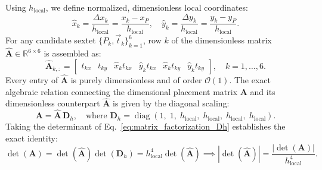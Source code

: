 \documentclass[preprint,12pt]{elsarticle}
\begin{document}
Using $h_{\mathrm{local}}$, we define normalized, dimensionless local coordinates:
\begin{equation}
\hat{x}_k = \frac{\Delta x_k}{h_{\mathrm{local}}} = \frac{x_k - x_P}{h_{\mathrm{local}}}, \quad \hat{y}_k = \frac{\Delta y_k}{h_{\mathrm{local}}} = \frac{y_k - y_P}{h_{\mathrm{local}}}.
\label{eq:normalized_local_coords}
\end{equation}
For any candidate sextet $\{P_k, \vec{t}_k\}_{k=1}^6$, row $k$ of the dimensionless matrix $\widehat{\mathbf{A}} \in \mathbb{R}^{6 \times 6}$ is assembled as:
\begin{equation}
\widehat{\mathbf{A}}_{k, :} = \begin{bmatrix} t_{kx} & t_{ky} & \hat{x}_k t_{kx} & \hat{y}_k t_{kx} & \hat{x}_k t_{ky} & \hat{y}_k t_{ky} \end{bmatrix}, \quad k = 1, \dots, 6.
\label{eq:matrix_A_hat_definition}
\end{equation}
Every entry of $\widehat{\mathbf{A}}$ is purely dimensionless and of order $\mathcal{O}(1)$. The exact algebraic relation connecting the dimensional placement matrix $\mathbf{A}$ and its dimensionless counterpart $\widehat{\mathbf{A}}$ is given by the diagonal scaling:
\begin{equation}
\mathbf{A} = \widehat{\mathbf{A}} \, \mathbf{D}_h, \quad \text{where } \mathbf{D}_h = \operatorname{diag}(1, \; 1, \; h_{\mathrm{local}}, \; h_{\mathrm{local}}, \; h_{\mathrm{local}}, \; h_{\mathrm{local}}).
\label{eq:matrix_factorization_Dh}
\end{equation}
Taking the determinant of Eq.~\eqref{eq:matrix_factorization_Dh} establishes the exact identity:
\begin{equation}
\det(\mathbf{A}) = \det(\widehat{\mathbf{A}}) \det(\mathbf{D}_h) = h_{\mathrm{local}}^4 \det(\widehat{\mathbf{A}}) \implies |\det(\widehat{\mathbf{A}})| = \frac{|\det(\mathbf{A})|}{h_{\mathrm{local}}^4}.
\label{eq:dimensionless_det_relation}
\end{equation}
\end{document}
